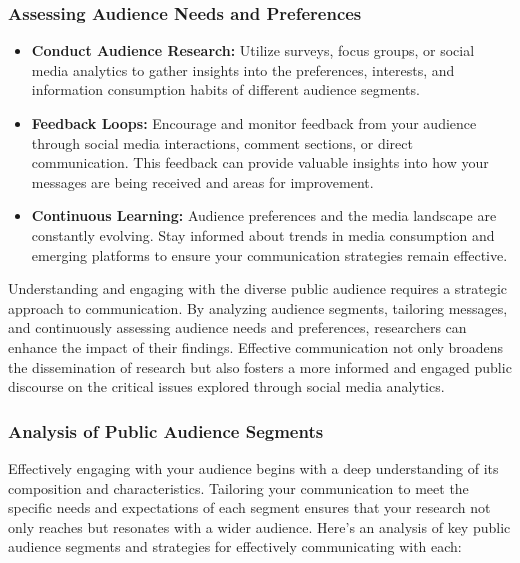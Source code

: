 \documentclass[
]{book}
\providecommand{\tightlist}{%
  \setlength{\itemsep}{0pt}\setlength{\parskip}{0pt}}
\begin{document}
\hypertarget{assessing-audience-needs-and-preferences}{%
\subsubsection{Assessing Audience Needs and Preferences}\label{assessing-audience-needs-and-preferences}}

\begin{itemize}
\tightlist
\item
  \textbf{Conduct Audience Research:} Utilize surveys, focus groups, or social media analytics to gather insights into the preferences, interests, and information consumption habits of different audience segments.
\item
  \textbf{Feedback Loops:} Encourage and monitor feedback from your audience through social media interactions, comment sections, or direct communication. This feedback can provide valuable insights into how your messages are being received and areas for improvement.
\item
  \textbf{Continuous Learning:} Audience preferences and the media landscape are constantly evolving. Stay informed about trends in media consumption and emerging platforms to ensure your communication strategies remain effective.
\end{itemize}

Understanding and engaging with the diverse public audience requires a strategic approach to communication. By analyzing audience segments, tailoring messages, and continuously assessing audience needs and preferences, researchers can enhance the impact of their findings. Effective communication not only broadens the dissemination of research but also fosters a more informed and engaged public discourse on the critical issues explored through social media analytics.

\hypertarget{analysis-of-public-audience-segments}{%
\subsubsection*{Analysis of Public Audience Segments}\label{analysis-of-public-audience-segments}}

Effectively engaging with your audience begins with a deep understanding of its composition and characteristics. Tailoring your communication to meet the specific needs and expectations of each segment ensures that your research not only reaches but resonates with a wider audience. Here's an analysis of key public audience segments and strategies for effectively communicating with each:
\end{document}
